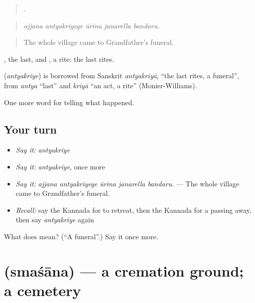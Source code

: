 \begin{quote}
    .
\end{quote}

\begin{quote}
\emph{ajjana antyakriyege ūrina janarella bandaru.}
\end{quote}

\begin{quote}
The whole village came to Grandfather's funeral.
\end{quote}

, the last, and , a rite: the last rites.

\begin{cousinweb}
\textbf{} (\emph{antyakriye}) is borrowed from Sanskrit \emph{antyakriyā}, \textquotedblleft{}the last rites, a funeral\textquotedblright{}, from \emph{antya} \textquotedblleft{}last\textquotedblright{} and \emph{kriyā} \textquotedblleft{}an act, a rite\textquotedblright{} (Monier-Williams).
\end{cousinweb}

\begin{grammarlens}[title={What you've built}]
One more word for telling what happened.
\end{grammarlens}

\subsection*{Your turn}
\begin{itemize}
\raggedright
  \item \emph{Say it:} \emph{antyakriye}
  \item \emph{Say it:} \emph{antyakriye}, once more
  \item \emph{Say it:} \emph{ajjana antyakriyege ūrina janarella bandaru.} — The whole village came to Grandfather's funeral.
  \item \emph{Recall:} say the Kannada for to retreat, then the Kannada for a passing away, then say \emph{antyakriye} again
\end{itemize}

\begin{tcolorbox}[breakable,colback=teal!4,colframe=teal!35!black,title={Before you move on}]
What does  mean? (\textquotedblleft{}A funeral\textquotedblright{}.) Say it once more.
\end{tcolorbox}
\section[\texorpdfstring{\kn{ಸ್ಮಶಾನ} (smaśāna)}{ಸ್ಮಶಾನ (smaśāna)}]{ (smaśāna) — a cremation ground; a cemetery}

